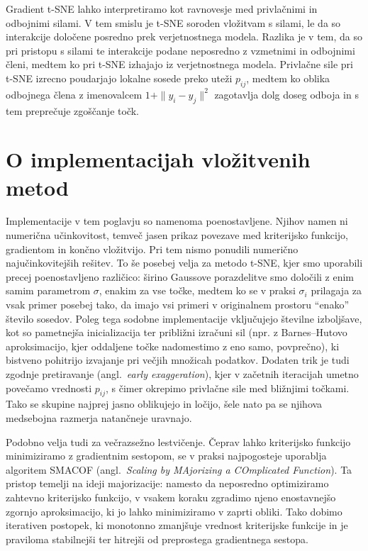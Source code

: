 Gradient t-SNE lahko interpretiramo kot ravnovesje med privlačnimi in odbojnimi silami. V tem smislu je t-SNE soroden vložitvam s silami, le da so interakcije določene posredno prek verjetnostnega modela. Razlika je v tem, da so pri pristopu s silami te interakcije podane neposredno z vzmetnimi in odbojnimi členi, medtem ko pri t-SNE izhajajo iz verjetnostnega modela. 
Privlačne sile pri t-SNE izrecno poudarjajo lokalne sosede preko uteži \( p_{ij} \), medtem ko oblika odbojnega člena z imenovalcem \( 1 + \|y_i - y_j\|^2 \) zagotavlja dolg doseg odboja in s tem preprečuje zgoščanje točk.

\section{O implementacijah vložitvenih metod}

Implementacije v tem poglavju so namenoma poenostavljene. Njihov namen ni numerična učinkovitost, temveč jasen prikaz povezave med kriterijsko funkcijo, gradientom in končno vložitvijo. Pri tem nismo ponudili numerično najučinkovitejših rešitev. To še posebej velja za metodo t-SNE, kjer smo uporabili precej poenostavljeno različico: širino Gaussove porazdelitve smo določili z enim samim parametrom $\sigma$, enakim za vse točke, medtem ko se v praksi $\sigma_i$ prilagaja za vsak primer posebej tako, 
%
da imajo vsi primeri v originalnem prostoru ``enako'' število sosedov. Poleg tega sodobne implementacije vključujejo številne izboljšave, kot so pametnejša inicializacija ter približni izračuni sil (npr. z Barnes--Hutovo aproksimacijo, kjer oddaljene točke nadomestimo z eno samo, povprečno), ki bistveno pohitrijo izvajanje pri večjih množicah podatkov. Dodaten trik je tudi zgodnje pretiravanje (angl.~\emph{early exaggeration}), kjer v začetnih iteracijah umetno povečamo vrednosti $p_{ij}$, s čimer okrepimo privlačne sile med bližnjimi točkami. Tako se skupine najprej jasno oblikujejo in ločijo, šele nato pa se njihova medsebojna razmerja natančneje uravnajo.

Podobno velja tudi za večrazsežno lestvičenje. Čeprav lahko kriterijsko funkcijo minimiziramo z gradientnim sestopom, se v praksi najpogosteje uporablja algoritem SMACOF (angl.~\emph{Scaling by MAjorizing a COmplicated Function}). Ta pristop temelji na ideji majorizacije: namesto da neposredno optimiziramo zahtevno kriterijsko funkcijo, v vsakem koraku zgradimo njeno enostavnejšo zgornjo aproksimacijo, ki jo lahko minimiziramo v zaprti obliki. Tako dobimo iterativen postopek, ki monotonno zmanjšuje vrednost kriterijske funkcije in je praviloma stabilnejši ter hitrejši od preprostega gradientnega sestopa.

